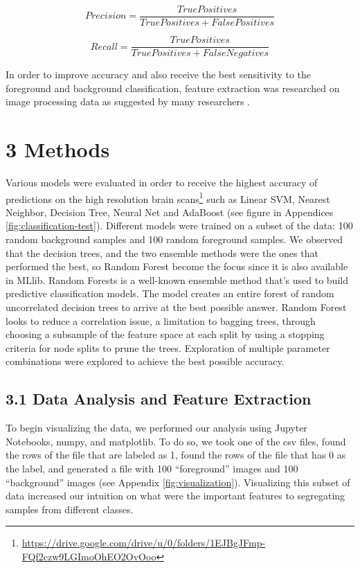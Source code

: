 \documentclass{neu_handout}
\begin{document}
$$ Precision = \frac{True Positives}{True Positives + False Positives} $$

$$ Recall = \frac{True Positives}{True Positives + False Negatives} $$

In order to improve accuracy and also receive the best sensitivity to the foreground and background classification, feature extraction was researched on image processing data as suggested by many researchers \cite{imageproc}.


\section*{3 Methods}
Various models were evaluated in order to receive the highest accuracy of predictions on the high resolution brain scans\footnote{\url{https://drive.google.com/drive/u/0/folders/1EJBgJFmp-FQf2czw9LGImoOhEO2OvOoo}} such as Linear SVM, Nearest Neighbor, Decision Tree, Neural Net and AdaBoost (see figure in Appendices {\ref{fig:classification-test}}). Different models were trained on a subset of the data: 100 random background samples and 100 random foreground samples. We observed that the decision trees, and the two ensemble methods were the ones that performed the best, so Random Forest become the focus since it is also available in MLlib. Random Forests is a well-known ensemble method that's used to build predictive classification models. The model creates an entire forest of random uncorrelated decision trees to arrive at the best possible answer. Random Forest looks to reduce a correlation issue, a limitation to bagging trees, through choosing a subsample of the feature space at each split by using a stopping criteria for node splits to prune the trees. Exploration of multiple parameter combinations were explored to achieve the best possible accuracy. \\

\subsection*{3.1 Data Analysis and Feature Extraction}
To begin visualizing the data, we performed our analysis using Jupyter Notebooks, numpy, and matplotlib. To do so, we took one of the csv files, found the rows of the file that are labeled as 1, found the rows of the file that has 0 as the label, and generated a file with 100 ``foreground'' images and 100 ``background'' images (see Appendix \ref{fig:visualization}). Visualizing this subset of data increased our intuition on what were the important features to segregating samples from different classes.\\
\end{document}
